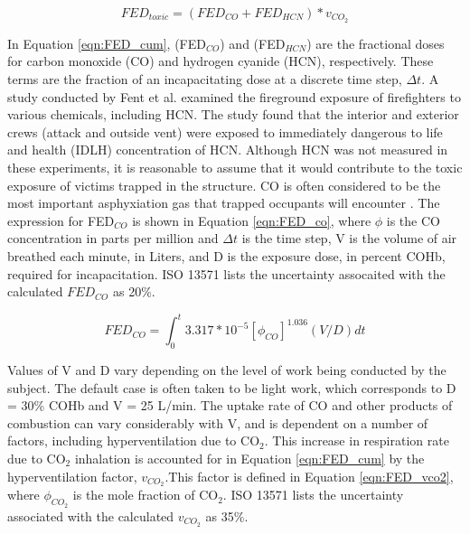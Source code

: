 \documentclass[12pt,oneside]{article}
\begin{document}
\begin{equation}\label{eqn:FED_cum}FED_{toxic}=(FED_{CO}+FED_{HCN})*v_{CO_2}\end{equation}

In Equation \ref{eqn:FED_cum},  (FED$_{CO}$) and  (FED$_{HCN}$) are the fractional doses for carbon monoxide  (CO) and hydrogen cyanide (HCN), respectively. These terms are the fraction of an incapacitating dose at a discrete time step, $\Delta t$. A study conducted by Fent et al. \cite{Fent:2017} examined the fireground exposure of firefighters to various chemicals, including HCN. The study found that the interior and exterior crews (attack and outside vent) were exposed to immediately dangerous to life and health (IDLH) concentration of HCN. Although HCN was not measured in these experiments, it is reasonable to assume that it would contribute to the toxic exposure of victims trapped in the structure. CO is often considered to be the most important asphyxiation gas that trapped occupants will encounter \cite{SFPE:Purser}. The expression for FED$_{CO}$ is shown in Equation \ref{eqn:FED_co}, where $\phi$ is the CO concentration in parts per million and $\Delta t $ is the time step, V is the volume of air breathed each minute, in Liters, and D is the exposure dose, in percent COHb, required for incapacitation. ISO 13571 \cite{ISO13571} lists the uncertainty assocaited with  the calculated $FED_{CO}$ as 20\%.

\begin{equation}\label{eqn:FED_co}FED_{CO} = \int_{0}^{t} 3.317 * 10^{-5} [\phi_{CO}]^{1.036}(V/D)dt\end{equation}

Values of V and D vary depending on the level of work being conducted by the subject. The default case is often taken to be light work, which corresponds to D = 30\% COHb and V = 25 L/min. The uptake rate of CO and other products of combustion can vary considerably with V, and is dependent on a number of factors, including hyperventilation due to CO$_2$. This increase in respiration rate due to CO$_2$ inhalation is accounted for in Equation \ref{eqn:FED_cum} by the hyperventilation factor, $v_{CO_2}$.This factor is defined in Equation \ref{eqn:FED_vco2}, where $\phi_{CO_2}$ is the mole fraction of CO$_2$. ISO 13571 \cite{ISO13571} lists the uncertainty associated with the calculated $v_{CO_2}$ as 35\%.
\end{document}
